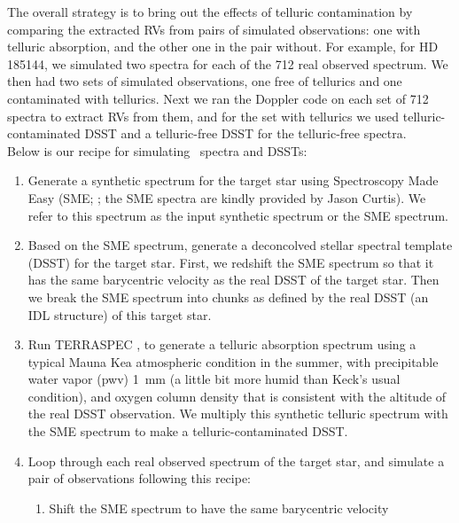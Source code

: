 The overall strategy is to bring out the effects of telluric
contamination by comparing the extracted RVs from pairs of simulated
observations: one with telluric absorption, and the other one in the
pair without. For example, for HD 185144, we simulated two spectra for
each of the 712 real observed spectrum. We then had two sets of
simulated observations, one free of tellurics and one contaminated
with tellurics. Next we ran the Doppler code on each set of 712
spectra to extract RVs from them, and for the set with tellurics we
used telluric-contaminated DSST and a telluric-free DSST for the
telluric-free spectra. \\

Below is our recipe for simulating \keck\ spectra and DSSTs:
\begin{enumerate}
\item Generate a synthetic spectrum for the target star using
  Spectroscopy Made Easy (SME;
  \citealt{valentipiskunov1996,valentifischer2005}; the SME spectra are
  kindly provided by Jason Curtis). We refer to this spectrum as the
  input synthetic spectrum or the SME spectrum.
\item Based on the SME spectrum, generate a deconcolved stellar
  spectral template (DSST) for the target
  star. First, we redshift the SME spectrum so that it has the same
  barycentric velocity as the real DSST of the target star. Then we
  break the SME spectrum into chunks as defined by the real DSST (an IDL
  structure) of this target star.
\item Run TERRASPEC , to generate a telluric absorption spectrum using a
  typical Mauna Kea atmospheric condition in the summer, with
  precipitable water vapor (pwv) 1~mm (a little bit more humid than
  Keck's usual condition), and oxygen column density that is consistent
  with the altitude of the real DSST observation. We multiply this
  synthetic telluric spectrum with the SME spectrum to make a
  telluric-contaminated DSST.
\item Loop through each real observed spectrum of the target star, and
  simulate a pair of observations following this recipe:
  \begin{enumerate}
  \item Shift the SME spectrum to have the same barycentric velocity

\end{enumerate}
\end{enumerate}
